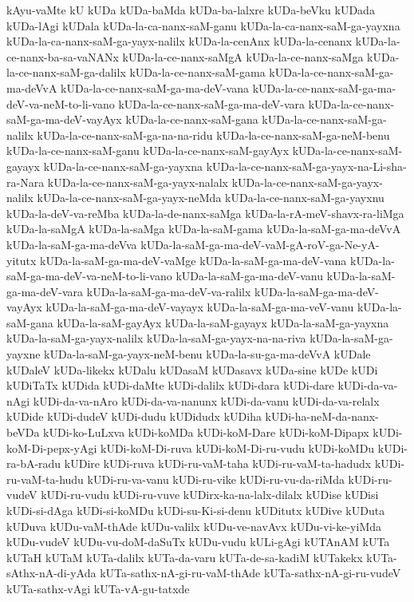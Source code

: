 {kAyu-vaMte
kU
kUDa
kUDa-baMda
kUDa-ba-lalxre
kUDa-beVku
kUDada
kUDa-lAgi
kUDala
kUDa-la-ca-nanx-saM-ganu
kUDa-la-ca-nanx-saM-ga-yayxna
kUDa-la-ca-nanx-saM-ga-yayx-nalilx
kUDa-la-cenAnx
kUDa-la-cenanx
kUDa-la-ce-nanx-ba-sa-vaNANx
kUDa-la-ce-nanx-saMgA
kUDa-la-ce-nanx-saMga
kUDa-la-ce-nanx-saM-ga-dalilx
kUDa-la-ce-nanx-saM-gama
kUDa-la-ce-nanx-saM-ga-ma-deVvA
kUDa-la-ce-nanx-saM-ga-ma-deV-vana
kUDa-la-ce-nanx-saM-ga-ma-deV-va-neM-to-li-vano
kUDa-la-ce-nanx-saM-ga-ma-deV-vara
kUDa-la-ce-nanx-saM-ga-ma-deV-vayAyx
kUDa-la-ce-nanx-saM-gana
kUDa-la-ce-nanx-saM-ga-nalilx
kUDa-la-ce-nanx-saM-ga-na-na-ridu
kUDa-la-ce-nanx-saM-ga-neM-benu
kUDa-la-ce-nanx-saM-ganu
kUDa-la-ce-nanx-saM-gayAyx
kUDa-la-ce-nanx-saM-gayayx
kUDa-la-ce-nanx-saM-ga-yayxna
kUDa-la-ce-nanx-saM-ga-yayx-na-Li-sha-ra-Nara
kUDa-la-ce-nanx-saM-ga-yayx-nalalx
kUDa-la-ce-nanx-saM-ga-yayx-nalilx
kUDa-la-ce-nanx-saM-ga-yayx-neMda
kUDa-la-ce-nanx-saM-ga-yayxnu
kUDa-la-deV-va-reMba
kUDa-la-de-nanx-saMga
kUDa-la-rA-meV-shavx-ra-liMga
kUDa-la-saMgA
kUDa-la-saMga
kUDa-la-saM-gama
kUDa-la-saM-ga-ma-deVvA
kUDa-la-saM-ga-ma-deVva
kUDa-la-saM-ga-ma-deV-vaM-gA-roV-ga-Ne-yA-yitutx
kUDa-la-saM-ga-ma-deV-vaMge
kUDa-la-saM-ga-ma-deV-vana
kUDa-la-saM-ga-ma-deV-va-neM-to-li-vano
kUDa-la-saM-ga-ma-deV-vanu
kUDa-la-saM-ga-ma-deV-vara
kUDa-la-saM-ga-ma-deV-va-ralilx
kUDa-la-saM-ga-ma-deV-vayAyx
kUDa-la-saM-ga-ma-deV-vayayx
kUDa-la-saM-ga-ma-veV-vanu
kUDa-la-saM-gana
kUDa-la-saM-gayAyx
kUDa-la-saM-gayayx
kUDa-la-saM-ga-yayxna
kUDa-la-saM-ga-yayx-nalilx
kUDa-la-saM-ga-yayx-na-na-riva
kUDa-la-saM-ga-yayxne
kUDa-la-saM-ga-yayx-neM-benu
kUDa-la-su-ga-ma-deVvA
kUDale
kUDaleV
kUDa-likekx
kUDalu
kUDasaM
kUDasavx
kUDa-sine
kUDe
kUDi
kUDiTaTx
kUDida
kUDi-daMte
kUDi-dalilx
kUDi-dara
kUDi-dare
kUDi-da-va-nAgi
kUDi-da-va-nAro
kUDi-da-va-nanunx
kUDi-da-vanu
kUDi-da-va-relalx
kUDide
kUDi-dudeV
kUDi-dudu
kUDidudx
kUDiha
kUDi-ha-neM-da-nanx-beVDa
kUDi-ko-LuLxva
kUDi-koMDa
kUDi-koM-Dare
kUDi-koM-Dipapx
kUDi-koM-Di-pepx-yAgi
kUDi-koM-Di-ruva
kUDi-koM-Di-ru-vudu
kUDi-koMDu
kUDi-ra-bA-radu
kUDire
kUDi-ruva
kUDi-ru-vaM-taha
kUDi-ru-vaM-ta-hadudx
kUDi-ru-vaM-ta-hudu
kUDi-ru-va-vanu
kUDi-ru-vike
kUDi-ru-vu-da-riMda
kUDi-ru-vudeV
kUDi-ru-vudu
kUDi-ru-vuve
kUDirx-ka-na-lalx-dilalx
kUDise
kUDisi
kUDi-si-dAga
kUDi-si-koMDu
kUDi-su-Ki-si-denu
kUDitutx
kUDive
kUDuta
kUDuva
kUDu-vaM-thAde
kUDu-valilx
kUDu-ve-navAvx
kUDu-vi-ke-yiMda
kUDu-vudeV
kUDu-vu-doM-daSuTx
kUDu-vudu
kULi-gAgi
kUTAnAM
kUTa
kUTaH
kUTaM
kUTa-dalilx
kUTa-da-varu
kUTa-de-sa-kadiM
kUTakekx
kUTa-sAthx-nA-di-yAda
kUTa-sathx-nA-gi-ru-vaM-thAde
kUTa-sathx-nA-gi-ru-vudeV
kUTa-sathx-vAgi
kUTa-vA-gu-tatxde
}
